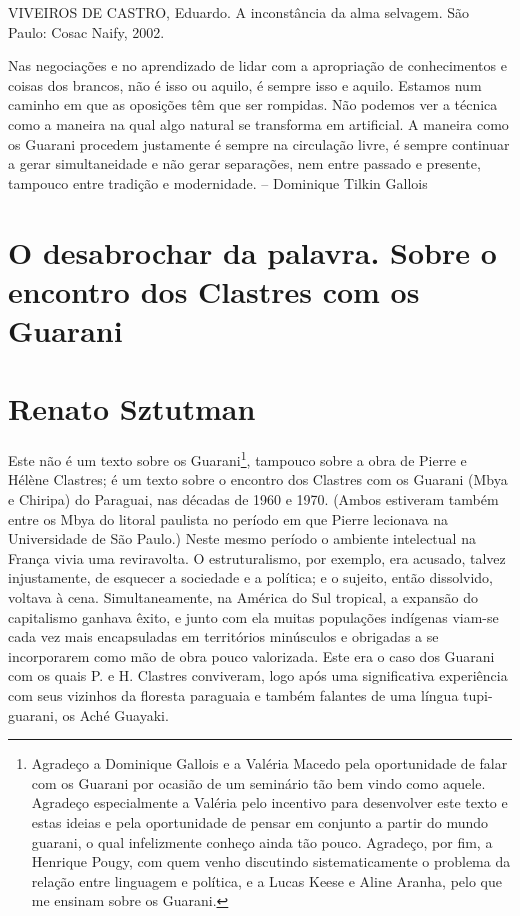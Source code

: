 \documentclass{article}
\begin{document}
VIVEIROS DE CASTRO, Eduardo. A inconst\^ancia da alma selvagem. S\~ao
Paulo: Cosac Naify, 2002.

Nas negocia\c{c}\~oes e no aprendizado de lidar com a apropria\c{c}\~ao
de conhecimentos e coisas dos brancos, n\~ao \'e isso ou aquilo, \'e
sempre isso e aquilo. Estamos num caminho em que as oposi\c{c}\~oes
t\^em que ser rompidas. N\~ao podemos ver a t\'ecnica como a maneira na
qual algo natural se transforma em artificial. A maneira como os
Guarani procedem justamente \'e sempre na circula\c{c}\~ao livre, \'e
sempre continuar a gerar simultaneidade e n\~ao gerar separa\c{c}\~oes,
nem entre passado e presente, tampouco entre tradi\c{c}\~ao e
modernidade. -- Dominique Tilkin Gallois

\section[O desabrochar da palavra. Sobre o encontro dos Clastres com os
Guarani]{O desabrochar da palavra. Sobre o encontro dos Clastres com os
Guarani}
\section[Renato Sztutman]{Renato Sztutman\footnotemark{}}
Este n\~ao \'e um texto sobre os Guarani\footnote{ Agrade\c{c}o a
Dominique Gallois e a Val\'eria Macedo pela oportunidade de falar com
os Guarani por ocasi\~ao de um semin\'ario t\~ao bem vindo como aquele.
Agrade\c{c}o especialmente a Val\'eria pelo incentivo para desenvolver
este texto e estas ideias e pela oportunidade de pensar em conjunto a
partir do mundo guarani, o qual infelizmente conhe\c{c}o ainda t\~ao
pouco. Agrade\c{c}o, por fim, a Henrique Pougy, com quem venho
discutindo sistematicamente o problema da rela\c{c}\~ao entre linguagem
e pol\'itica, e a Lucas Keese e Aline Aranha, pelo que me ensinam sobre
os Guarani.}, tampouco sobre a obra de Pierre e H\'el\`ene Clastres;
\'e um texto sobre o encontro dos Clastres com os Guarani (Mbya e
Chiripa) do Paraguai, nas d\'ecadas de 1960 e 1970. (Ambos estiveram
tamb\'em entre os Mbya do litoral paulista no per\'iodo em que Pierre
lecionava na Universidade de S\~ao Paulo.) Neste mesmo per\'iodo o
ambiente intelectual na Fran\c{c}a vivia uma reviravolta. O
estruturalismo, por exemplo, era acusado, talvez injustamente, de
esquecer a sociedade e a pol\'itica; e o sujeito, ent\~ao dissolvido,
voltava \`a cena. Simultaneamente, na Am\'erica do Sul tropical, a
expans\~ao do capitalismo ganhava \^exito, e junto com ela muitas
popula\c{c}\~oes ind\'igenas viam-se cada vez mais encapsuladas em
territ\'orios min\'usculos e obrigadas a se incorporarem como m\~ao de
obra pouco valorizada. Este era o caso dos Guarani com os quais P. e H.
Clastres conviveram, logo ap\'os uma significativa experi\^encia com
seus vizinhos da floresta paraguaia e tamb\'em falantes de uma l\'ingua
tupi-guarani, os Ach\'e Guayaki.
\end{document}
